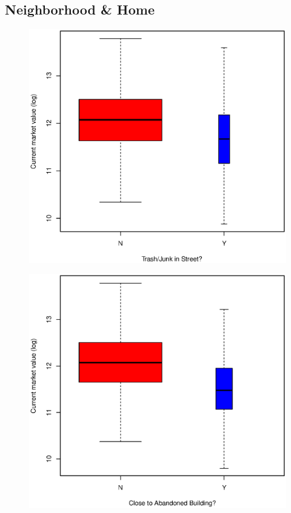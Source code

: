 \documentclass[11pt, fleqn]{article}
\begin{document}
\subsection{Neighborhood \& Home}

\begin{figure}[!htb]
  \centering
  \includegraphics[scale=.5]{ejunk.eps}
  \caption{}
  \label{fig:ejunk}
\end{figure}

\begin{figure}[!htb]
  \centering
  \includegraphics[scale=.5]{eaban.eps}
  \caption{}
  \label{fig:eaban.eps}
\end{figure}
\end{document}
